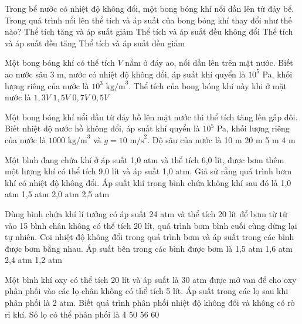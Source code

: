 \begin{ex}
Trong bể nước có nhiệt độ không đổi, một bong bóng khí nổi dần lên từ đáy bể. Trong quá trình nổi lên thể tích và áp suất của bong bóng khí thay đổi như thế nào?
\choice
{Thể tích tăng và áp suất giảm}
{Thể tích và áp suất đều không đổi}
{Thể tích và áp suất đều tăng}
{Thể tích và áp suất đều giảm}
\end{ex}

\begin{ex}
Một bong bóng khí có thể tích $V$ nằm ở đáy ao, nổi dần lên trên mặt nước. Biết ao nước sâu 3 m, nước có nhiệt độ không đổi, áp suất khí quyển là $10^5$ Pa, khối lượng riêng của nước là $10^3 \text{ kg/m}^3$. Thể tích của bong bóng khí này khi ở mặt nước là
\choice
{$1,3V$}
{$1,5V$}
{$0,7V$}
{$0,5V$}
\end{ex}

\begin{ex}
Một bong bóng khí nổi dần từ đáy hồ lên mặt nước thì thể tích tăng lên gấp đôi. Biết nhiệt độ nước hồ không đổi, áp suất khí quyển là $10^5$ Pa, khối lượng riêng của nước là $1000 \text{ kg/m}^3$ và $g = 10 \text{ m/s}^2$. Độ sâu của nước là
\choice
{10 m}
{20 m}
{5 m}
{4 m}
\end{ex}

\begin{ex}
Một bình đang chứa khí ở áp suất 1,0 atm và thể tích 6,0 lít, được bơm thêm một lượng khí có thể tích 9,0 lít và áp suất 1,0 atm. Giả sử rằng quá trình bơm khí có nhiệt độ không đổi. Áp suất khí trong bình chứa không khí sau đó là
\choice
{1,0 atm}
{1,5 atm}
{2,0 atm}
{2,5 atm}
\end{ex}

\begin{ex}
Dùng bình chứa khí lí tưởng có áp suất 24 atm và thể tích 20 lít để bơm từ từ vào 15 bình chân không có thể tích 20 lít, quá trình bơm bình cuối cùng dừng lại tự nhiên. Coi nhiệt độ không đổi trong quá trình bơm và áp suất trong các bình được bơm bằng nhau. Áp suất bên trong các bình được bơm là
\choice
{1,5 atm}
{1,6 atm}
{2,4 atm}
{1,2 atm}
\end{ex}

\begin{ex}
Một bình khí oxy có thể tích 20 lít và áp suất là 30 atm được mở van để cho oxy phân phối vào các lọ chân không có thể tích 5 lít. Áp suất trong các lọ sau khi phân phối là 2 atm. Biết quá trình phân phối nhiệt độ không đổi và không có rò rỉ khí. Số lọ có thể phân phối là
\choice
{4}
{50}
{56}
{60}
\end{ex}


